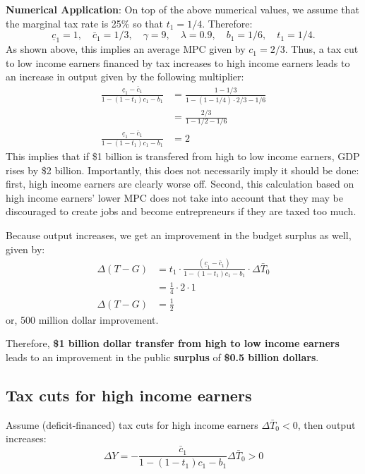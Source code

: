 \documentclass[]{book}
\begin{document}
\textbf{Numerical Application}: On top of the above numerical values, we
assume that the marginal tax rate is 25\% so that \(t_1=1/4\).
Therefore:
\[\underline{c}_{1}=1, \quad \bar{c}_{1}=1/3,\quad \gamma=9, \quad\lambda=0.9,\quad b_1=1/6, \quad t_1=1/4.\]
As shown above, this implies an average MPC given by \(c_1=2/3.\) Thus,
a tax cut to low income earners financed by tax increases to high income
earners leads to an increase in output given by the following
multiplier: \[
\begin{aligned}
\frac{\underline{c}_{1}-\bar{c}_{1}}{1-(1-t_1)c_{1}-b_{1}} &= \frac{1-1/3}{1-(1-1/4) \cdot 2/3-1/6}\\
&= \frac{2/3}{1-1/2-1/6}\\
\frac{\underline{c}_{1}-\bar{c}_{1}}{1-(1-t_1)c_{1}-b_{1}} &=2
\end{aligned}
\] This implies that if \$1 billion is transfered from high to low
income earners, GDP rises by \$2 billion. Importantly, this does not
necessarily imply it should be done: first, high income earners are
clearly worse off. Second, this calculation based on high income
earners' lower MPC does not take into account that they may be
discouraged to create jobs and become entrepreneurs if they are taxed
too much.

Because output increases, we get an improvement in the budget surplus as
well, given by: \[
\begin{aligned}
\Delta\left(T-G\right)&=t_1 \cdot \frac{\left(\underline{c}_{1}-\bar{c}_{1}\right)}{1-\left(1-t_{1}\right)c_{1}-b_{1}} \cdot \Delta\bar{T}_{0}\\
&=\frac{1}{4} \cdot 2 \cdot 1\\
\Delta\left(T-G\right)&=\frac{1}{2}
\end{aligned}
\] or, 500 million dollar improvement.

Therefore, \textbf{\$1 billion dollar transfer from high to low income
earners} leads to an improvement in the public \textbf{surplus} of
\textbf{\$0.5 billion dollars}.

\subsection{Tax cuts for high income
earners}\label{tax-cuts-for-high-income-earners}

Assume (deficit-financed) tax cuts for high income earners
\(\Delta\bar{T}_{0}<0\), then output increases:
\[\Delta Y=-\frac{\bar{c}_{1}}{1-\left(1-t_{1}\right)c_{1}-b_{1}}\Delta\bar{T}_{0}>0\]
\end{document}
